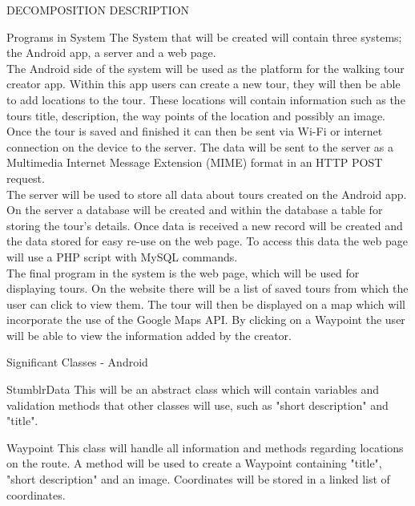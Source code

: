 \documentclass{article}
\begin{document}
	\begin{section}{DECOMPOSITION DESCRIPTION}
		\begin{subsection}{Programs in System}
		The System that will be created will contain three systems; the Android app, a server and a web page. \\

		The Android side of the system will be used as the platform for the walking tour creator app. Within this app users can create a new tour, they will then be able to add locations to the tour. These locations will contain information such as the tours title, description, the way points of the location and possibly an image. Once the tour is saved and finished it can then be sent via Wi-Fi or internet connection on the device to the server. The data will be sent to the server as a Multimedia Internet Message Extension (MIME) format in an HTTP POST request.\\

		The server will be used to store all data about tours created on the Android app. On the server a database will be created and within the database a table for storing the tour's details. Once data is received a new record will be created and the data stored for easy re-use on the web page. To access this data the web page will use a PHP script with MySQL commands.\\

		The final program in the system is the web page, which will be used for displaying tours. On the website there will be a list of saved tours from which the user can click to view them. The tour will then be displayed on a map which will incorporate the use of the Google Maps API. By clicking on a Waypoint the user will be able to view the information added by the creator.
		\end{subsection}


	    \clearpage
	    \begin{subsection}{Significant Classes - Android}
		    \begin{subsubsection}{StumblrData}
		    This will be an abstract class which will contain variables and validation methods that other classes will use, such as "short description" and "title".
		    \end{subsubsection}

		    \begin{subsubsection}{Waypoint}
		    This class will handle all information and methods regarding locations on the route. A method will be used to create a Waypoint containing "title", "short description" and an image. Coordinates will be stored in a linked list of coordinates.
		    \end{subsubsection}


\end{subsection}
\end{section}
\end{document}
